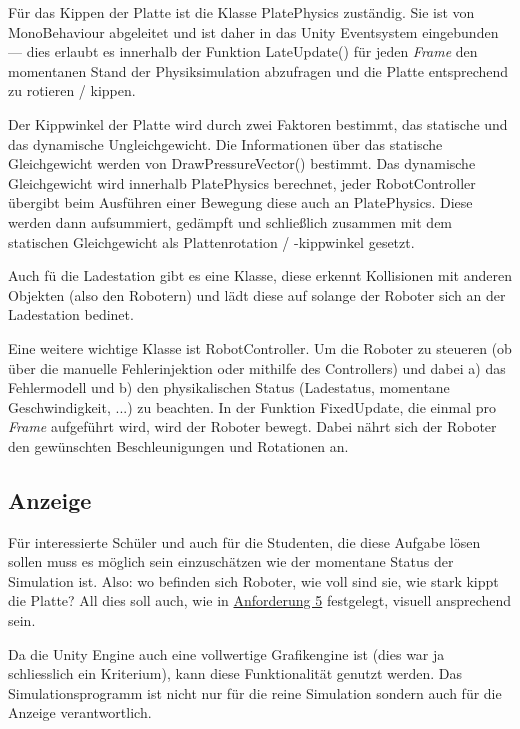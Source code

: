 F{\"{u}}r das Kippen der Platte ist die Klasse PlatePhysics zust{\"{a}}ndig. Sie ist von MonoBehaviour abgeleitet und ist daher
in das Unity Eventsystem eingebunden --- dies erlaubt es innerhalb der Funktion LateUpdate() f{\"{u}}r jeden \textit{\gls{Frame}} den momentanen
Stand der Physiksimulation abzufragen und die Platte entsprechend zu rotieren / kippen.

Der Kippwinkel der Platte wird durch zwei Faktoren bestimmt, das statische und das dynamische Ungleichgewicht. Die Informationen {\"{u}}ber
das statische Gleichgewicht werden von DrawPressureVector() bestimmt. Das dynamische Gleichgewicht wird innerhalb PlatePhysics berechnet,
jeder RobotController {\"{u}}bergibt beim Ausf{\"{u}}hren einer Bewegung diese auch an PlatePhysics. Diese werden dann aufsummiert, ged{\"{a}}mpft
und schlie{\ss}lich zusammen mit dem statischen Gleichgewicht als Plattenrotation / -kippwinkel gesetzt.

Auch f{\"{u}} die Ladestation gibt es eine Klasse, diese erkennt Kollisionen mit anderen Objekten (also den Robotern) und l{\"{a}}dt diese auf
solange der Roboter sich an der Ladestation bedinet.

Eine weitere wichtige Klasse ist RobotController. Um die Roboter zu steueren (ob {\"{u}}ber die manuelle Fehlerinjektion oder mithilfe des
Controllers) und dabei a) das Fehlermodell und b) den physikalischen Status (Ladestatus, momentane Geschwindigkeit, ...) zu beachten. In der
Funktion FixedUpdate, die einmal pro \textit{Frame} aufgef{\"{u}}hrt wird, wird der Roboter bewegt. Dabei n{\"{a}}hrt sich der Roboter den
gew{\"{u}}nschten Beschleunigungen und Rotationen an.

\subsection{Anzeige}\label{graphics}
F{\"{u}}r interessierte Sch{\"{u}}ler und auch f{\"{u}}r die Studenten, die diese Aufgabe l{\"{o}}sen
sollen muss es m{\"{o}}glich sein einzusch{\"{a}}tzen wie der momentane Status der Simulation ist.
Also: wo befinden sich Roboter, wie voll sind sie, wie stark kippt die Platte? All dies soll auch, wie
in \hyperref[anforderung]{Anforderung 5} festgelegt, visuell ansprechend sein.

Da die Unity Engine auch eine vollwertige Grafikengine ist (dies war ja schliesslich ein Kriterium),
kann diese Funktionalit{\"{a}}t genutzt werden. Das Simulationsprogramm ist nicht nur f{\"{u}}r die
reine Simulation sondern auch f{\"{u}}r die Anzeige verantwortlich.

